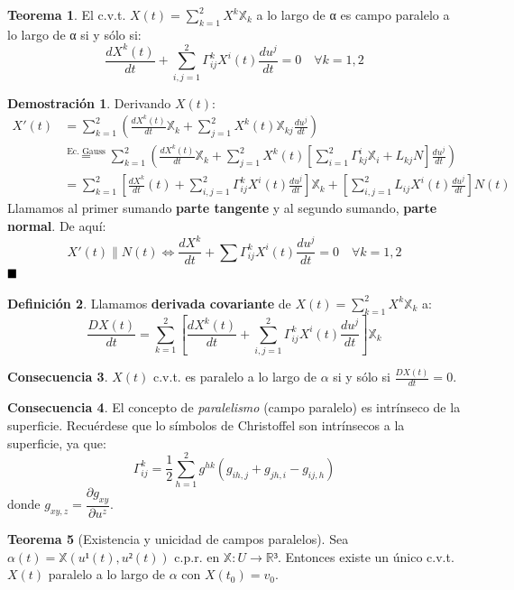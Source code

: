 \documentclass[twoside]{report}
\theoremstyle{definition}
\newtheorem{theorem}{Teorema}[section]
\newtheorem{consecuencia}[theorem]{Consecuencia}
\newtheorem{defi}[theorem]{Definición}
\newtheorem*{dem}{Demostración}
\newcommand*{\QED}{\hfill\ensuremath{\blacksquare}}
\numberwithin{equation}{section}
\newcommand{\R}{\mathbb{R}}
\newcommand{\X}{\mathbb{X}}
\begin{document}
\begin{theorem}
El c.v.t. $X(t)=\sum_{k=1}^2 X^k \X_k$ a lo largo de α es campo paralelo a lo largo de α si y sólo si:
\[ \frac{dX^k(t)}{dt} + \sum_{i,j=1}^2 Γ_{ij}^k X^i(t) \frac{du^j}{dt} = 0 \quad \forall k=1,2 \]
\end{theorem}
\begin{dem}
Derivando $X(t)$:
\begin{align*} X'(t) & = \sum_{k=1}^2 \left(\frac{dX^k(t)}{dt}\X_k + \sum_{j=1}^2 X^k(t)\X_{kj}\frac{du^j}{dt}\right) \\
 & \overset{\text{Ec. Gauss}}{=} \sum_{k=1}^2 \left(\frac{dX^k(t)}{dt}\X_k + \sum_{j=1}^2 X^k(t)\left[\sum_{i=1}^2 Γ_{kj}^i \X_i + L_{kj}N\right]\frac{du^j}{dt}\right) \\
 & = \sum_{k=1}^2 \left[ \frac{dX^k}{dt}(t) + \sum_{i,j=1}^2 Γ_{ij}^k X^i(t) \frac{du^j}{dt}\right]\X_k + \left[\sum_{i,j=1}^2 L_{ij} X^i(t) \frac{du^j}{dt}\right]N(t)
\end{align*}
Llamamos al primer sumando \textbf{parte  tangente} y al segundo sumando, \textbf{parte normal}. De aquí:
\[ X'(t) \parallel N(t) \Leftrightarrow \frac{dX^k}{dt} + \sum Γ_{ij}^k X^i(t) \frac{du^j}{dt} = 0\quad \forall k=1,2\]
$\QED$
\end{dem}

\begin{defi}
Llamamos \textbf{derivada covariante} de $X(t) = \sum_{k=1}^2 X^k \X_k$ a:
\[ \frac{DX(t)}{dt} = \sum_{k=1}^2 \left[ \frac{dX^k(t)}{dt} + \sum_{i,j=1}^2 Γ_{ij}^k X^i(t) \frac{du^j}{dt}\right]\X_k\]
\end{defi}

\begin{consecuencia}
$X(t)$ c.v.t. es paralelo a lo largo de $α$ si y sólo si $\frac{DX(t)}{dt} = 0$.
\end{consecuencia}

\begin{consecuencia}
El concepto de \emph{paralelismo} (campo paralelo) es intrínseco de la superficie. Recuérdese que lo símbolos de Christoffel son intrínsecos a la superficie, ya que:
\[ Γ_{ij}^k = \frac{1}{2} \sum_{h=1}^2 g^{hk} (g_{ih,j}+g_{jh,i}-g_{ij,h}) \]
donde $g_{xy,z} = \dfrac{\partial g_{xy}}{\partial u^z}$.
\end{consecuencia}

\begin{theorem}[Existencia y unicidad de campos paralelos]
Sea $α(t) = \X(u¹(t), u²(t))$ c.p.r. en $\X : U \to \R³$. Entonces existe un único c.v.t. $X(t)$ paralelo a lo largo de $α$ con $X(t_0)=v_0$.
\end{theorem}
\end{document}
